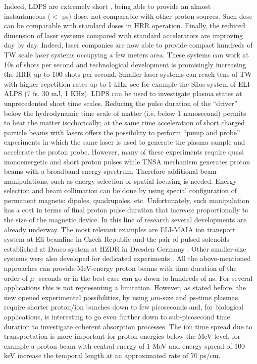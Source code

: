 \documentclass{cup-hpl}
\begin{document}
Indeed, LDPS are extremely short \cite{dro16}, being able to provide an almost instantaneous ($<$ ps) dose, not comparable with other proton sources. Such dose can be comparable with standard doses in HRR operation. Finally, the reduced dimension of laser systems compared with standard accelerators are improving day by day. Indeed, laser companies are now able to provide compact hundreds of TW scale laser systems occupying a few meters area. These systems can work at 10s of shots per second and technological development is promisingly increasing the HRR up to 100 shots per second. Smaller laser systems can reach tens of TW with higher repetition rates up to 1 kHz, see for example the Silos system of ELI-ALPS (7 fs, 30 mJ, 1 KHz).
LDPS can be used to investigate plasma states  at unprecedented short time scales. Reducing the pulse duration of the “driver” below the hydrodynamic time scale of matter (i.e. below 1 nanosecond) permits to heat the matter isochorically; at the same time acceleration of short charged particle beams \cite{Alb21} with lasers offers the possibility to perform “pump and probe” experiments in which the same laser is used to generate the plasma sample and accelerate the proton probe. However, many of these experiments require quasi monoenergetic and short proton pulses while TNSA mechanism generates proton beams with a broadband energy spectrum. Therefore additional beam manipulations, such as energy selection or spatial focusing is needed. Energy selection and beam collimation can be done by using special configuration of permanent magnets: dipoles, quadrupoles, etc. 
Unfortunately, such manipulation has a cost in terms of final proton pulse duration that increase proportionally to the size of the magnetic device. In this line of research several developments are already underway. The most relevant examples are  ELI-MAIA ion transport system at Eli beamline in Czech Republic \cite{mar18,cir20} and the pair of pulsed solenoids established at Draco system at HZDR in Dresden Germany \cite{kro22}. Other smaller-size systems were also developed for dedicated experiments \cite{che14,ten16}. All the above-mentioned approaches can provide MeV-energy proton beams with time duration of the order of $\mu$- seconds or in the best case can go down to hundreds of ns. For several applications this is not representing a limitation. However, as stated before, the new opened experimental possibilities, by using $\mu$m-size and ps-time plasmas, require shorter proton/ion bunches down to few picoseconds and, for biological applications, is interesting to go even further down to sub-picosecond time duration to investigate coherent absorption processes. The ion time spread due to transportation is more important for proton energies below the MeV level, for example a proton beam with central energy of  1 MeV and energy spread of 100 keV increase the temporal length at an approximated rate of 70 ps/cm.
\end{document}
